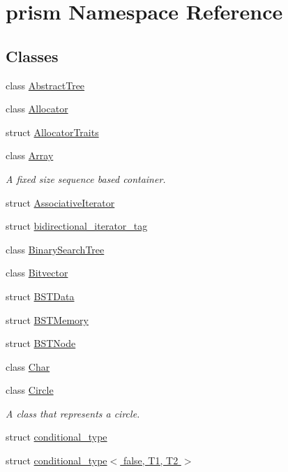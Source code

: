 \hypertarget{namespaceprism}{}\section{prism Namespace Reference}
\label{namespaceprism}
\subsection*{Classes}
\begin{DoxyCompactItemize}
\item 
class \hyperlink{classprism_1_1_abstract_tree}{Abstract\+Tree}
\item 
class \hyperlink{classprism_1_1_allocator}{Allocator}
\item 
struct \hyperlink{structprism_1_1_allocator_traits}{Allocator\+Traits}
\item 
class \hyperlink{classprism_1_1_array}{Array}
\begin{DoxyCompactList}\small\item\em A fixed size sequence based container. \end{DoxyCompactList}\item 
struct \hyperlink{structprism_1_1_associative_iterator}{Associative\+Iterator}
\item 
struct \hyperlink{structprism_1_1bidirectional__iterator__tag}{bidirectional\+\_\+iterator\+\_\+tag}
\item 
class \hyperlink{classprism_1_1_binary_search_tree}{Binary\+Search\+Tree}
\item 
class \hyperlink{classprism_1_1_bitvector}{Bitvector}
\item 
struct \hyperlink{structprism_1_1_b_s_t_data}{B\+S\+T\+Data}
\item 
struct \hyperlink{structprism_1_1_b_s_t_memory}{B\+S\+T\+Memory}
\item 
struct \hyperlink{structprism_1_1_b_s_t_node}{B\+S\+T\+Node}
\item 
class \hyperlink{classprism_1_1_char}{Char}
\item 
class \hyperlink{classprism_1_1_circle}{Circle}
\begin{DoxyCompactList}\small\item\em A class that represents a circle. \end{DoxyCompactList}\item 
struct \hyperlink{structprism_1_1conditional__type}{conditional\+\_\+type}
\item 
struct \hyperlink{structprism_1_1conditional__type_3_01false_00_01_t1_00_01_t2_01_4}{conditional\+\_\+type$<$ false, T1, T2 $>$}

\end{DoxyCompactItemize}
